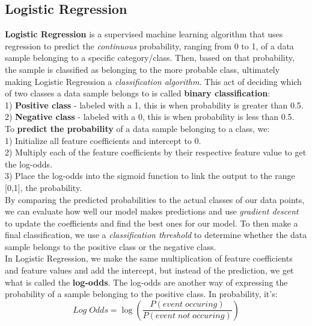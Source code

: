 \documentclass[11pt, a4paper]{article}
\begin{document}
\begin{spacing}{1.1}
	\subsection{Logistic Regression}
	\textbf{Logistic Regression} is a supervised machine learning algorithm that uses regression to predict the \textit{continuous} probability, ranging from 0 to 1, of a data sample belonging to a specific category/class. Then, based on that probability, the sample is classified as belonging to the more probable class, ultimately making Logistic Regression a \textit{classification algorithm}. This act of deciding which of two classes a data sample belongs to is called \textbf{binary classification}: \vspace*{1mm}\\
	\hspace*{3mm} 1) \textbf{Positive class} - labeled with a 1, this is when probability is greater than 0.5. \\
	\hspace*{3mm} 2) \textbf{Negative class} - labeled with a 0, this is when probability is less than 0.5. \vspace*{2mm}\\
	To \textbf{predict the probability} of a data sample belonging to a class, we: \vspace*{.5mm}\\	
	\hspace*{3mm} 1) Initialize all feature coefficients and intercept to 0. \\
	\hspace*{3mm} 2) Multiply each of the feature coefficients by their respective feature value to get the log-odds. \\
	\hspace*{3mm} 3) Place the log-odds into the sigmoid function to link the output to the range [0,1], the probability.\vspace*{1.5mm}\\
	By comparing the predicted probabilities to the actual classes of our data points, we can evaluate how well our model makes predictions and use \textit{gradient descent} to update the coefficients and find the best ones for our model. To then make a final classification, we use a \textit{classification threshold} to determine whether the data sample belongs to the positive class or the negative class. \vspace*{2mm}\\
	In Logistic Regression, we make the same multiplication of feature coefficients and feature values and add the intercept, but instead of the prediction, we get what is called the \textbf{log-odds}. The log-odds are another way of expressing the probability of a sample belonging to the positive class. In probability, it's: $$ Log\; Odds = \log(\frac{P(event\; occuring)}{P(event\; not\; occuring)}) $$

\end{spacing}
\end{document}
